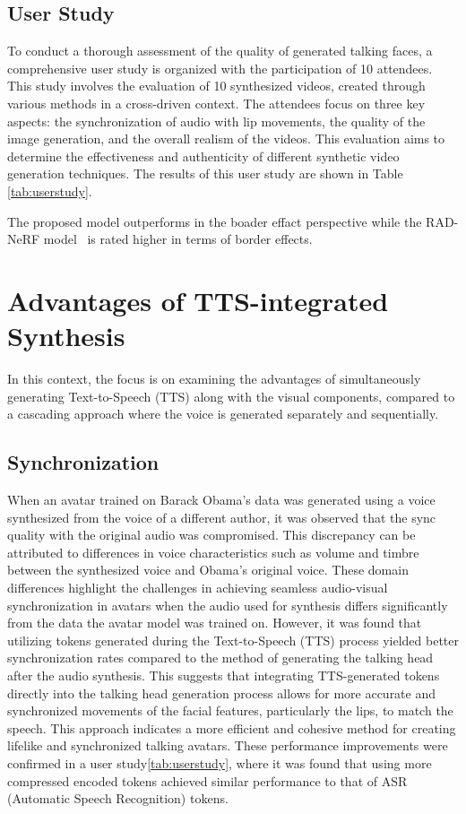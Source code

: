 \subsection{User Study}
\label{sec:user_study}
To conduct a thorough assessment of the quality of generated talking faces, a comprehensive user study is organized with the participation of 10 attendees.
This study involves the evaluation of 10 synthesized videos, created through various methods in a cross-driven context.
The attendees focus on three key aspects: the synchronization of audio with lip movements, the quality of the image generation, and the overall realism of the videos.
This evaluation aims to determine the effectiveness and authenticity of different synthetic video generation techniques.
The results of this user study are shown in Table \ref{tab:userstudy}.

The proposed model outperforms in the boader effact perspective while the RAD-NeRF model~\cite{tang2022radnerf} is rated higher in terms of border effects.

\section{Advantages of TTS-integrated Synthesis}
In this context, the focus is on examining the advantages of simultaneously generating Text-to-Speech (TTS) along with the visual components,
compared to a cascading approach where the voice is generated separately and sequentially. 

\subsection{Synchronization}
\label{sec:synchronization}
When an avatar trained on Barack Obama's data was generated using a voice synthesized from the voice of a different author, it was observed that the sync quality with the original audio was compromised.
This discrepancy can be attributed to differences in voice characteristics such as volume and timbre between the synthesized voice and Obama's original voice. These domain differences highlight the challenges in achieving seamless audio-visual synchronization in avatars when the audio used for synthesis differs significantly from the data the avatar model was trained on.
However, it was found that utilizing tokens generated during the Text-to-Speech (TTS) process yielded better synchronization rates compared to the method of generating the talking head after the audio synthesis.
This suggests that integrating TTS-generated tokens directly into the talking head generation process allows for more accurate and synchronized movements of the facial features, particularly the lips, to match the speech. This approach indicates a more efficient and cohesive method for creating lifelike and synchronized talking avatars.
These performance improvements were confirmed in a user study\ref{tab:userstudy}, where it was found that using more compressed encoded tokens achieved similar performance to that of ASR (Automatic Speech Recognition) tokens.

